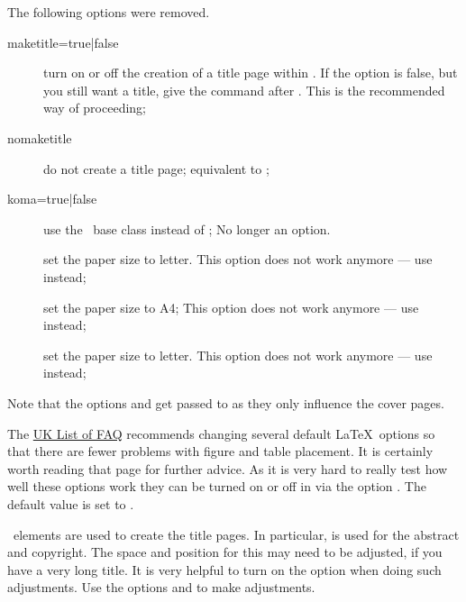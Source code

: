 The following options were removed.
\begin{description}
\item[maketitle={\normalfont true}|false] turn on or off the creation of a title page within .
   If the option is false, but you still want a title, give the command  after
  \verb||.
  This is the recommended way of proceeding;
\item[nomaketitle]\mbox{}
    do not create a title page; equivalent to ;
\item[koma=true|{\normalfont false}] use the \KOMAScript\ base class  instead of ;
   No longer an option.
\item[] set the paper size to letter.
   This option does not work anymore
  --- use  instead;
\item[] set the paper size to A4;
   This option does not work anymore
  --- use  instead;
\item[] set the paper size to letter.
   This option does not work anymore
  --- use  instead;
\end{description}
Note that the options  and  get passed to 
as they only influence the cover pages.

The
\href{http://www.tex.ac.uk/cgi-bin/texfaq2html?label=floats}{UK List of FAQ}
recommends changing several default \LaTeX\ options so that there are fewer problems
with figure and table placement.
It is certainly worth reading that page for further advice.
As it is very hard to really test how well these options work
they can be turned on or off in  via the option .
The default value is set to .

 \KOMAScript\ elements are used to create the title pages.
In particular,  is used for the abstract and copyright.
The space and position for this may need to be adjusted,
if you have a very long title. 
It is very helpful to turn on the  option when doing such adjustments.
 Use the options
 and  to make adjustments.


